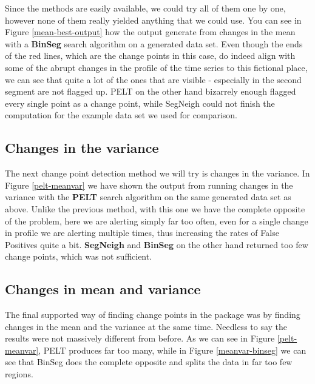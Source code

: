 \documentclass[minf,twoside,singlespacing,parskip,notimes,deptreport]{infthesis} %
\begin{document}
Since the methods are easily available, we could try all of them one by one, however none of them really yielded anything that we could use. You can see in Figure \ref{mean-best-output} how the output generate from changes in the mean with a \textbf{BinSeg} search algorithm on a generated data set. Even though the ends of the red lines, which are the change points in this case, do indeed align with some of the abrupt changes in the profile of the time series to this fictional place, we can see that quite a lot of the ones that are visible - especially in the second segment are not flagged up. PELT on the other hand bizarrely enough flagged every single point as a change point, while SegNeigh could not finish the computation for the example data set we used for comparison. 


\subsection{Changes in the variance}

The next change point detection method we will try is changes in the variance. In Figure \ref{pelt-meanvar} we have shown the output from running changes in the variance with the \textbf{PELT} search algorithm on the same generated data set as above. Unlike the previous method, with this one we have the complete opposite of the problem, here we are alerting simply far too often, even for a single change in profile we are alerting multiple times, thus increasing the rates of False Positives quite a bit. 
 \textbf{SegNeigh} and  \textbf{BinSeg} on the other hand returned too few change points, which was not sufficient. 


\subsection{Changes in mean and variance}

The final supported way of finding change points in the package was by finding changes in the mean and the variance at the same time. Needless to say the results were not massively different from before. As we can see in Figure \ref{pelt-meanvar}, PELT produces far too many, while in Figure \ref{meanvar-binseg} we can see that BinSeg does the complete opposite and splits the data in far too few regions. 
\end{document}
